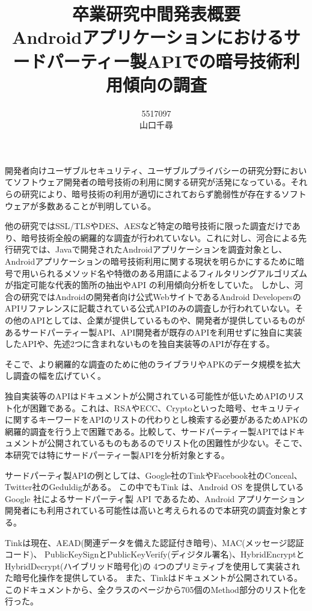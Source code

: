 \documentclass[twocolumn, 10pt, a4paper]{jarticle}
\title{\vspace{-3cm}
{\large 卒業研究中間発表概要}\\
{\bf
Androidアプリケーションにおけるサードパーティー製APIでの暗号技術利用傾向の調査
}
}
\author{
5517097 \\		%
山口千尋		%
}
\date{}
\begin{document}
\maketitle
\thispagestyle{empty}

開発者向けユーザブルセキュリティ、ユーザブルプライバシーの研究分野においてソフトウェア開発者の暗号技術の利用に関する研究が活発になっている。それらの研究により、暗号技術の利用が適切にされておらず脆弱性が存在するソフトウェアが多数あることが判明している。

他の研究ではSSL/TLSやDES、AESなど特定の暗号技術に限った調査だけであり、暗号技術全般の網羅的な調査が行われていない。これに対し、河合による先行研究\cite{Kawai}では、Javaで開発されたAndroidアプリケーションを調査対象とし、Androidアプリケーションの暗号技術利用に関する現状を明らかにするために暗号で用いられるメソッド名や特徴のある用語によるフィルタリングアルゴリズムが指定可能な代表的箇所の抽出やAPI の利用傾向分析をしていた。
しかし、河合の研究ではAndroidの開発者向け公式WebサイトであるAndroid Developers\cite{Android_Developers}のAPIリファレンスに記載されている公式APIのみの調査しか行われていない。その他のAPIとしては、企業が提供しているものや、開発者が提供しているものがあるサードパーティー製API、API開発者が既存のAPIを利用せずに独自に実装したAPIや、先述2つに含まれないものを独自実装等のAPIが存在する。

そこで、より網羅的な調査のために他のライブラリやAPKのデータ規模を拡大し調査の幅を広げていく。

独自実装等のAPIはドキュメントが公開されている可能性が低いためAPIのリスト化が困難である。これは、RSAやECC、Cryptoといった暗号、セキュリティに関するキーワードをAPIのリストの代わりとし検索する必要があるためAPKの網羅的調査を行う上で困難である。比較して、サードパーティー製APIではドキュメントが公開されているものもあるのでリスト化の困難性が少ない。そこで、本研究では特にサードパーティー製APIを分析対象とする。

サードパーティ製APIの例としては、Google社のTink\cite{Tink}やFacebook社のConceal\cite{Conceal}、Twitter社のGeduldig\cite{Geduldig}がある。
この中でもTink は、Android OS を提供している Google 社によるサードパーティ製 API であるため、Android
アプリケーション開発者にも利用されている可能性は高いと考えられるので本研究の調査対象とする。

Tinkは現在、AEAD(関連データを備えた認証付き暗号)、MAC(メッセージ認証コード)、
PublicKeySignとPublicKeyVerify(ディジタル署名)、HybridEncryptとHybridDecrypt(ハイブリッド暗号化)の
4つのプリミティブを使用して実装された暗号化操作を提供している。
また、Tinkはドキュメントが公開されている。
このドキュメントから、全クラスのページから705個のMethod部分のリスト化を行った。
\end{document}

